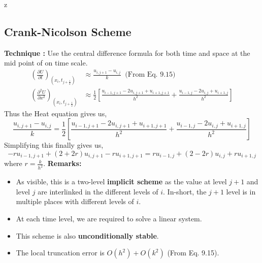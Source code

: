 z\documentclass[a4paper,12pt,twoside]{book}
\newcommand{\nll}[0]{\newline\newline}
\newcommand{\pder}[2]{\frac{\partial #1}{\partial #2}}
\begin{document}
\subsection{Crank-Nicolson Scheme}
\textbf{Technique : }Use the central difference formula for both time and space at the mid point of on time scale.
\nll
\begin{equation}
    \begin{split}
        \left( \pder{U}{t} \right)_{\left(x_i,t_{j+\frac{1}{2}}\right)} &\approx \frac{u_{i,j+1} - u_{i,j}}{k}\;\;\text{(From Eq. 9.15)}\\
        \left( \pder{^2U}{x^2} \right)_{\left(x_i,t_{j+\frac{1}{2}}\right)} &\approx \frac{1}{2}\left[ \frac{u_{i-1,j+1}-2u_{i,j+1} + u_{i+1,j+1}}{h^2} + \frac{u_{i-1,j} - 2u_{i,j} + u_{i+1,j}}{h^2}\right]
    \end{split}
\end{equation}
Thus the Heat equation gives us,
\begin{equation*}
    \frac{u_{i,j+1} - u_{i,j}}{k} = \frac{1}{2}\left[ \frac{u_{i-1,j+1}-2u_{i,j+1} + u_{i+1,j+1}}{h^2} + \frac{u_{i-1,j} - 2u_{i,j} + u_{i+1,j}}{h^2}\right]
\end{equation*}
Simplifying this finally gives us,
\begin{equation}
-ru_{i-1,j+1} + (2+2r)u_{i,j+1} - ru_{i+1,j+1} = ru_{i-1,j} + (2-2r)u_{i,j} + ru_{i+1,j}
\end{equation}
where $r = \frac{k}{h^2}$.
\nll
\textbf{Remarks:}
\begin{itemize}
    \item{As visible, this is a two-level \textbf{implicit scheme} as the value at level $j+1$ and level $j$ are interlinked in the different levels of $i$. In-short, the $j+1$ level is in multiple places with different levels of $i$.}
    \item{At each time level, we are required to solve a linear system.}
    \item{This scheme is also \textbf{unconditionally stable}.}
    \item{The local truncation error is $O(h^2) + O(k^2)$ (From Eq. 9.15).}
\end{itemize}
\end{document}
